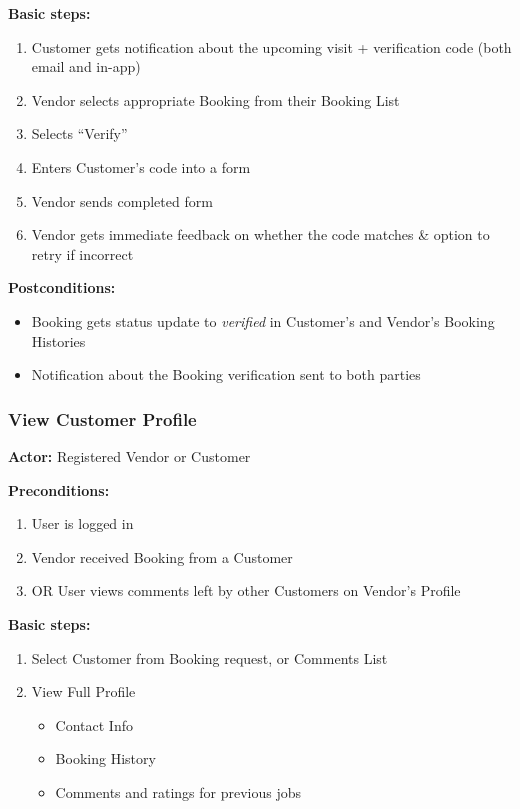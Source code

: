 \documentclass[11pt,a4paper]{article}
\begin{document}
\noindent \textbf{Basic steps:}
\begin{enumerate}
  \item Customer gets notification about the upcoming visit + verification code (both email and in-app)
  \item Vendor selects appropriate Booking from their Booking List
  \item Selects ``Verify''
  \item Enters Customer's code into a form
  \item Vendor sends completed form
  \item Vendor gets immediate feedback on whether the code matches \& option to retry if incorrect
\end{enumerate}

\noindent \textbf{Postconditions:}
\begin{itemize}
  \item Booking gets status update to \textit{verified} in Customer's and Vendor's Booking Histories
  \item Notification about the Booking verification sent to both parties
\end{itemize}

\subsubsection{View Customer Profile}

\textbf{Actor:} Registered Vendor or Customer

\noindent \textbf{Preconditions:}
\begin{enumerate}
  \item User is logged in
  \item Vendor received Booking from a Customer
  \item OR User views comments left by other Customers on Vendor's Profile
\end{enumerate}

\noindent \textbf{Basic steps:}
\begin{enumerate}
  \item Select Customer from Booking request, or Comments List
  \item View Full Profile
    \begin{itemize}
      \item Contact Info
      \item Booking History
      \item Comments and ratings for previous jobs
    \end{itemize}
\end{enumerate}
\end{document}
